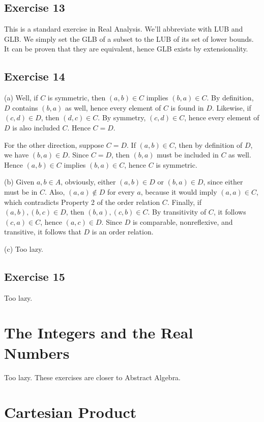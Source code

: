 \documentclass{book}
\begin{document}
\subsection*{Exercise 13}
This is a standard exercise in Real Analysis. We'll abbreviate with LUB and GLB. We simply set the GLB of a subset to the LUB of its set of lower bounds. It can be proven that they are equivalent, hence GLB exists by extensionality.

\subsection*{Exercise 14}
(a)
Well, if $C$ is symmetric, then $(a, b) \in C$ implies $(b, a) \in C$. By definition, $D$ contains $(b, a)$ as well, hence every element of $C$ is found in $D$. Likewise, if $(c, d) \in D$, then $(d, c) \in C$. By symmetry, $(c, d) \in C$, hence every element of $D$ is also included $C$. Hence $C = D$.

For the other direction, suppose $C = D$. If $(a, b) \in C$, then by definition of $D$, we have $(b, a) \in D$. Since $C = D$, then $(b, a)$ must be included in $C$ as well. Hence $(a, b) \in C$ implies $(b, a) \in C$, hence $C$ is symmetric.

\noindent
(b)
Given $a, b \in A$, obviously, either $(a, b) \in D$ or $(b, a) \in D$, since either must be in $C$. Also, $(a, a) \not \in D$ for every $a$, because it would imply $(a, a) \in C$, which contradicts Property 2 of the order relation $C$. Finally, if $(a, b), (b, c) \in D$, then $(b, a), (c, b) \in C$. By transitivity of $C$, it follows $(c, a) \in C$, hence $(a, c) \in D$. Since $D$ is comparable, nonreflexive, and transitive, it follows that $D$ is an order relation.

\noindent
(c)
Too lazy.

\subsection*{Exercise 15}
Too lazy.

\section{The Integers and the Real Numbers}
Too lazy. These exercises are closer to Abstract Algebra.

\section{Cartesian Product}
\end{document}
